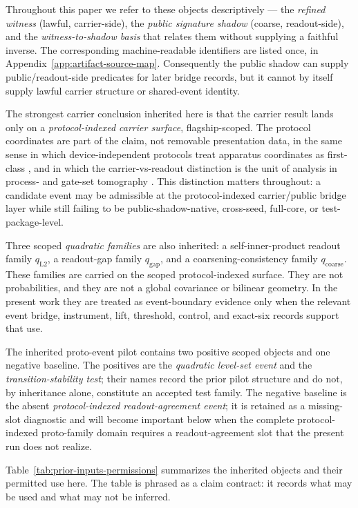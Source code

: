 \documentclass[11pt]{article}
\theoremstyle{definition}
\begin{document}
Throughout this paper we refer to these objects descriptively — the \emph{refined witness} (lawful, carrier-side), the \emph{public signature shadow} (coarse, readout-side), and the \emph{witness-to-shadow basis} that relates them without supplying a faithful inverse. The corresponding machine-readable identifiers are listed once, in Appendix~\ref{app:artifact-source-map}. Consequently the public shadow can supply public/readout-side predicates for later bridge records, but it cannot by itself supply lawful carrier structure or shared-event identity.

The strongest carrier conclusion inherited here is that the carrier result lands only on a \emph{protocol-indexed carrier surface}, flagship-scoped. The protocol coordinates are part of the claim, not removable presentation data, in the same sense in which device-independent protocols treat apparatus coordinates as first-class \citep{MayersYao1998}, and in which the carrier-vs-readout distinction is the unit of analysis in process- and gate-set tomography \citep{Nielsen2021GST}. This distinction matters throughout: a candidate event may be admissible at the protocol-indexed carrier/public bridge layer while still failing to be public-shadow-native, cross-seed, full-core, or test-package-level.

Three scoped \emph{quadratic families} are also inherited: a self-inner-product readout family $q_{\mathrm{L2}}$, a readout-gap family $q_{\mathrm{gap}}$, and a coarsening-consistency family $q_{\mathrm{coarse}}$. These families are carried on the scoped protocol-indexed surface. They are not probabilities, and they are not a global covariance or bilinear geometry. In the present work they are treated as event-boundary evidence only when the relevant event bridge, instrument, lift, threshold, control, and exact-six records support that use.

The inherited proto-event pilot contains two positive scoped objects and one negative baseline. The positives are the \emph{quadratic level-set event} and the \emph{transition-stability test}; their names record the prior pilot structure and do not, by inheritance alone, constitute an accepted test family. The negative baseline is the absent \emph{protocol-indexed readout-agreement event}; it is retained as a missing-slot diagnostic and will become important below when the complete protocol-indexed proto-family domain requires a readout-agreement slot that the present run does not realize.

Table~\ref{tab:prior-inputs-permissions} summarizes the inherited objects and their permitted use here. The table is phrased as a claim contract: it records what may be used and what may not be inferred.
\end{document}
